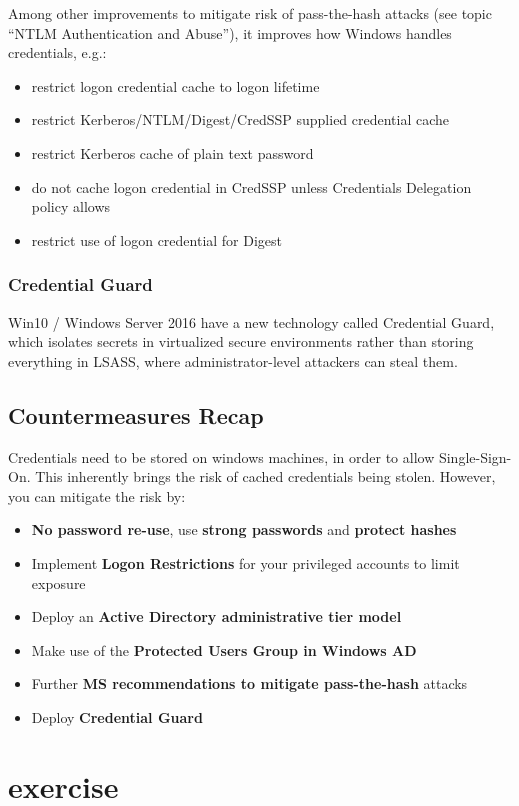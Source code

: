Among other improvements to mitigate risk of pass-the-hash attacks (see topic “NTLM Authentication and Abuse”), it improves how Windows handles credentials, e.g.:
\begin{itemize}
    \item restrict logon credential cache to logon lifetime
    \item restrict Kerberos/NTLM/Digest/CredSSP supplied credential cache
    \item restrict Kerberos cache of plain text password
    \item do not cache logon credential in CredSSP unless Credentials Delegation policy allows
    \item restrict use of logon credential for Digest
\end{itemize}

\subsubsection*{Credential Guard}
Win10 / Windows Server 2016 have a new technology called Credential Guard, which isolates secrets in virtualized secure environments rather than storing everything in LSASS, where administrator-level attackers can steal them.

\subsection*{Countermeasures Recap}

Credentials need to be stored on windows machines, in order to allow Single-Sign-On. This inherently brings the risk of cached credentials being stolen. However, you can mitigate the risk by:

\begin{itemize}
   \item \textbf{No password re-use}, use \textbf{strong passwords} and \textbf{protect hashes}
   
   \item Implement \textbf{Logon Restrictions} for your privileged accounts to limit exposure
   
   \item Deploy an \textbf{Active Directory administrative tier model}
   
   \item Make use of the \textbf{Protected Users Group in Windows AD}
   
   \item Further \textbf{MS recommendations to mitigate pass-the-hash} attacks
   
   \item Deploy \textbf{Credential Guard}
\end{itemize}

\section{exercise}

